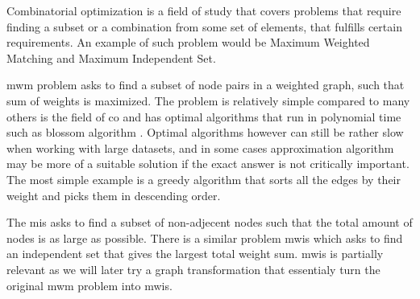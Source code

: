 Combinatorial optimization is a field of study that covers problems that require finding a subset or a combination from some set of elements, that fulfills certain requirements. An example of such problem would be Maximum Weighted Matching and Maximum Independent Set. 

\gls{mwm} problem asks to find a subset of node pairs in a weighted graph, such that sum of weights is maximized. The problem is relatively simple compared to many others is the field of \gls{co} and has optimal algorithms that run in polynomial time such as blossom algorithm \cite{blossom}. Optimal algorithms however can still be rather slow when working with large datasets, and in some cases approximation algorithm may be more of a suitable solution if the exact answer is not critically important. The most simple example is a greedy algorithm that sorts all the edges by their weight and picks them in descending order.

The \gls{mis} asks to find a subset of non-adjecent nodes such that the total amount of nodes is as large as possible. There is a similar problem \gls{mwis} which asks to find an independent set that gives the largest total weight sum. \gls{mwis} is partially relevant as we will later try a graph transformation that essentialy turn the original \gls{mwm} problem into \gls{mwis}.

